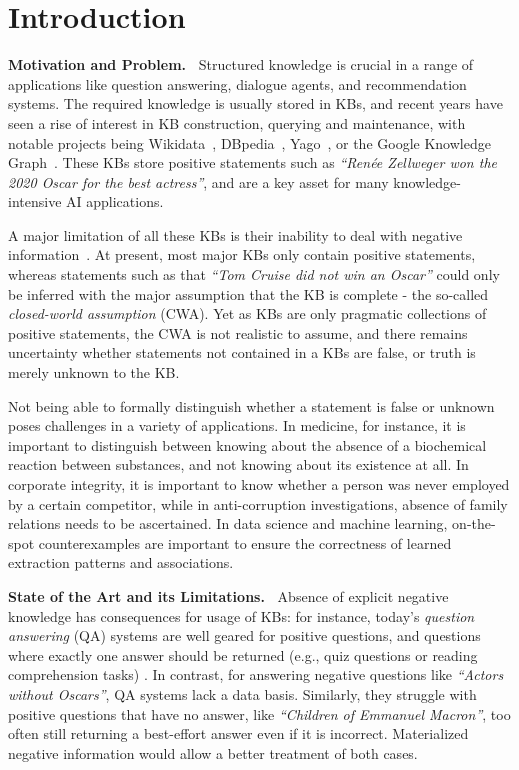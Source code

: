 \section{Introduction}
\label{sec:intro}
\noindent
\textbf{Motivation and Problem.\ }
Structured knowledge is crucial in a range of applications like question answering, dialogue agents, and recommendation systems. The required knowledge is usually stored in KBs, and recent years have seen a rise of interest in KB construction, querying and maintenance, with notable projects being Wikidata~\cite{WD}, DBpedia~\cite{DBPEDIA}, Yago~\cite{YAGO}, or the Google Knowledge Graph~\cite{GKG}. These KBs store positive statements such as \textit{``Ren\'{e}e Zellweger won the 2020 Oscar for the best actress''}, and are a key asset for many knowledge-intensive AI applications.

A major limitation of all these KBs is their inability to deal with negative information~\cite{FHPPW2006}. At present, most major KBs only contain positive statements, whereas statements such as that \textit{``Tom Cruise did not win an Oscar''} could only be inferred with the major assumption that the KB is complete - the so-called \textit{closed-world assumption} (CWA). Yet as KBs are only pragmatic collections of positive statements, the CWA is not realistic to assume, and there remains uncertainty whether statements not contained in a KBs are false, or truth is merely unknown to the KB. 

Not being able to formally distinguish whether a statement is false or unknown poses challenges in a variety of applications. In medicine, for instance, it is important to distinguish between knowing about the absence of a biochemical reaction between substances, and not knowing about its existence at all. In corporate integrity, it is important to know whether a person was never employed by a certain competitor, while in anti-corruption investigations, absence of family relations needs to be ascertained. In data science and machine learning, on-the-spot counterexamples are important to ensure the correctness of learned extraction patterns and associations.

\noindent
\textbf{State of the Art and its Limitations.\ }
Absence of explicit negative knowledge has consequences for usage of KBs: for instance, today's \textit{question answering} (QA) systems are well
geared for positive questions, and questions where exactly one answer should be returned (e.g., quiz questions or reading comprehension tasks) \cite{Fader2014,WIKIQA}. In contrast, for answering negative questions like \emph{``Actors without Oscars''}, QA systems lack a data basis. Similarly,
they struggle with positive questions that have no answer, like \emph{``Children of Emmanuel Macron''},
too often still returning a best-effort answer even if
it is incorrect. Materialized negative information would allow a better treatment of both cases. 


